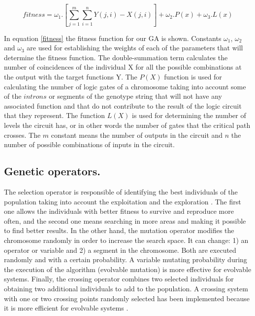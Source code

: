 \documentclass[runningheads,a4paper]{llncs}
\begin{document}
\begin{equation}
\label{fitness}
fitness=\omega_{1} . [ \sum_{j=1}^m \sum_{i=1}^n Y(j,i)-X(j,i) ] + \omega_{2}.P(x) + \omega_{3}.L(x)
\end{equation}


In equation \ref{fitness} the fitness function for our GA is shown. Constants $\omega_{1}$, $\omega_{2}$ and $\omega_{3}$ are used for establishing the weights of each of the parameters that will determine the fitness function. The double-summation term calculates the number of coincidences of the individual X for all the possible combinations at the output with the target functions Y. The $P(X)$ function is used for calculating the number of logic gates of a chromosome taking into account some of the $introns$ or segments of the genotype string that will not have any associated function and that do not contribute to the result of the logic circuit that they represent. The function $L(X)$ is used for determining the number of levels the circuit has, or in other words the number of gates that the critical path crosses. The $m$ constant means the number of outputs in the circuit and $n$ the number of possible combinations of inputs in the circuit.

\subsection{Genetic operators.}
The selection operator is responsible of identifying the best individuals of the population taking into account the exploitation and the exploration \cite{QYCC06}. The first one allows the individuals with better fitness to survive and reproduce more often, and the second one means searching in more areas and making it possible to find better results. In the other hand, the mutation operator modifies the chromosome randomly in order to increase the search space. It can change: 1) an operator or variable
and 2) a segment in the chromosome. Both are executed randomly and with a certain probability. A variable mutating probability during the execution of the algorithm (evolvable mutation) \cite{RKYZ02} is more effective for evolvable systems. Finally, the crossing operator combines two selected individuals for obtaining two additional individuals to add to the population. A crossing system with one or two crossing points randomly selected has been implemented because it is more efficient for evolvable systems \cite{JMPT98b}.


\end{document}
